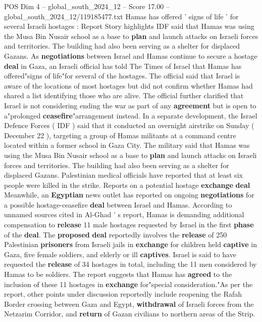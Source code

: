\begin{textsample}{POS Dim 4 – global\_south\_2024\_12 – Score 17.00 – global\_south\_2024\_12/119185477.txt}  \label{ex:f4_pos_260}
Hamas has offered ' signs of life ' for several Israeli hostages : Report Story highlights IDF said that Hamas was using the Musa Bin Nusair school as a base to \textbf{plan} and launch attacks on Israeli forces and territories.
The building had also been serving as a shelter for displaced Gazans.
As \textbf{negotiations} between Israel and Hamas continue to secure a hostage \textbf{deal} in Gaza, an Israeli official has told The Times of Israel that Hamas has offered"signs of life"for several of the hostages.
The official said that Israel is aware of the locations of most hostages but did not confirm whether Hamas had shared a list identifying those who are alive.
The official further clarified that Israel is not considering ending the war as part of any \textbf{agreement} but is open to a"prolonged \textbf{ceasefire}"arrangement instead.
In a separate development, the Israel Defence Forces ( IDF ) said that it conducted an overnight airstrike on Sunday ( December 22 ), targeting a group of Hamas militants at a command centre located within a former school in Gaza City.
The military said that Hamas was using the Musa Bin Nusair school as a base to \textbf{plan} and launch attacks on Israeli forces and territories.
The building had also been serving as a shelter for displaced Gazans.
Palestinian medical officials have reported that at least six people were killed in the strike.
Reports on a potential hostage \textbf{exchange} \textbf{deal} Meanwhile, an \textbf{Egyptian} news outlet has reported on ongoing \textbf{negotiations} for a possible hostage-ceasefire \textbf{deal} between Israel and Hamas.
According to unnamed sources cited in Al-Ghad ' s report, Hamas is demanding additional compensation to \textbf{release} 11 male hostages requested by Israel in the first \textbf{phase} of the \textbf{deal}.
The \textbf{proposed} \textbf{deal} reportedly involves the \textbf{release} of 250 Palestinian \textbf{prisoners} from Israeli jails in \textbf{exchange} for children held \textbf{captive} in Gaza, five female soldiers, and elderly or ill \textbf{captives}.
Israel is said to have requested the \textbf{release} of 34 hostages in total, including the 11 men considered by Hamas to be soldiers.
The report suggests that Hamas has \textbf{agreed} to the inclusion of these 11 hostages in \textbf{exchange} for"special consideration."As per the report, other points under discussion reportedly include reopening the Rafah Border crossing between Gaza and Egypt, \textbf{withdrawal} of Israeli forces from the Netzarim Corridor, and \textbf{return} of Gazan civilians to northern areas of the Strip.

\end{textsample}
